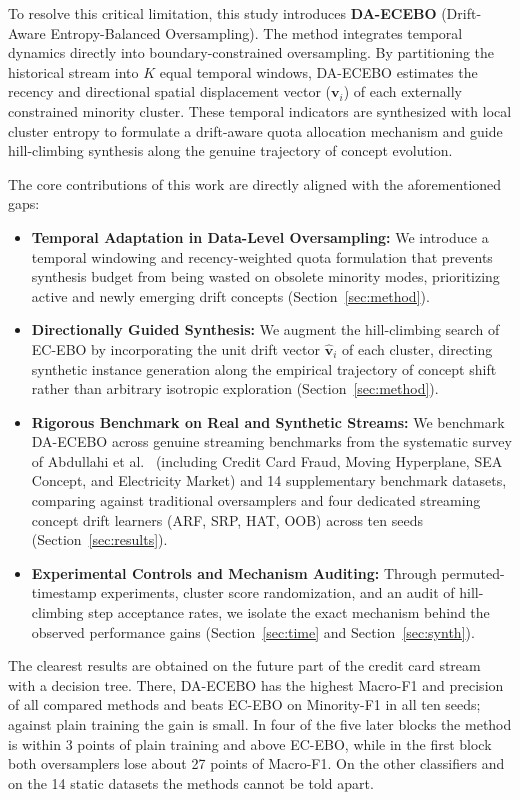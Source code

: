 \documentclass[preprint,10pt]{elsarticle}
\begin{document}
To resolve this critical limitation, this study introduces \textbf{DA-ECEBO} (Drift-Aware Entropy-Balanced Oversampling). The method integrates temporal dynamics directly into boundary-constrained oversampling. By partitioning the historical stream into $K$ equal temporal windows, DA-ECEBO estimates the recency and directional spatial displacement vector ($\mathbf{v}_i$) of each externally constrained minority cluster. These temporal indicators are synthesized with local cluster entropy to formulate a drift-aware quota allocation mechanism and guide hill-climbing synthesis along the genuine trajectory of concept evolution.

The core contributions of this work are directly aligned with the aforementioned gaps:
\begin{itemize}[leftmargin=1.5em]
\item \textbf{Temporal Adaptation in Data-Level Oversampling:} We introduce a temporal windowing and recency-weighted quota formulation that prevents synthesis budget from being wasted on obsolete minority modes, prioritizing active and newly emerging drift concepts (Section~\ref{sec:method}).
\item \textbf{Directionally Guided Synthesis:} We augment the hill-climbing search of EC-EBO by incorporating the unit drift vector $\hat{\mathbf{v}}_i$ of each cluster, directing synthetic instance generation along the empirical trajectory of concept shift rather than arbitrary isotropic exploration (Section~\ref{sec:method}).
\item \textbf{Rigorous Benchmark on Real and Synthetic Streams:} We benchmark DA-ECEBO across genuine streaming benchmarks from the systematic survey of Abdullahi et al.~\cite{abdullahi2025} (including Credit Card Fraud, Moving Hyperplane, SEA Concept, and Electricity Market) and 14 supplementary benchmark datasets, comparing against traditional oversamplers and four dedicated streaming concept drift learners (ARF, SRP, HAT, OOB) across ten seeds (Section~\ref{sec:results}).
\item \textbf{Experimental Controls and Mechanism Auditing:} Through permuted-timestamp experiments, cluster score randomization, and an audit of hill-climbing step acceptance rates, we isolate the exact mechanism behind the observed performance gains (Section~\ref{sec:time} and Section~\ref{sec:synth}).
\end{itemize}

The clearest results are obtained on the future part of the credit card stream with a decision tree. There, DA-ECEBO has the highest Macro-F1 and precision of all compared methods and beats EC-EBO on Minority-F1 in all ten seeds; against plain training the gain is small. In four of the five later blocks the method is within 3 points of plain training and above EC-EBO, while in the first block both oversamplers lose about 27 points of Macro-F1. On the other classifiers and on the 14 static datasets the methods cannot be told apart.
\end{document}
